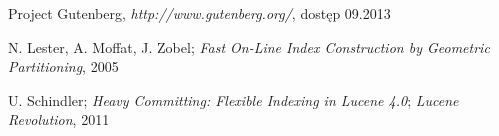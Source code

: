 \begin{thebibliography}{10}
 
  Project Gutenberg, \emph{http://www.gutenberg.org/}, dostęp 09.2013
 
  N. Lester, A. Moffat, J. Zobel; \emph{Fast On-Line Index Construction by Geometric Partitioning}, 2005
 
  U. Schindler; \emph{Heavy Committing: Flexible Indexing in Lucene 4.0}; \emph{Lucene Revolution}, 2011
 
\end{thebibliography}

